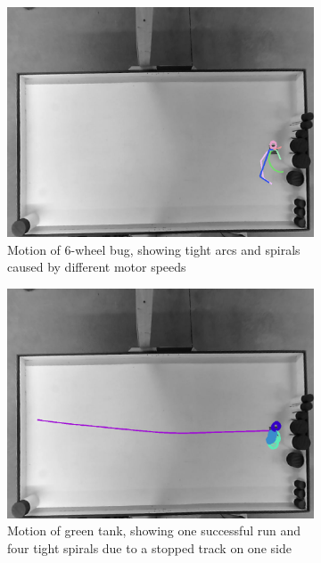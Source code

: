 \begin{figure}[h]
	\begin{subfigure}[t]{0.47\textwidth}
		\includegraphics[width=\textwidth]{../hardwareX_paper/robot_6.png}
		\caption{Motion of 6-wheel bug, showing tight arcs and spirals caused by different motor speeds\label{fig:bug_motion}}
	\end{subfigure}
	\begin{subfigure}[t]{0.47\textwidth}
		\includegraphics[width=\textwidth]{../hardwareX_paper/robot_0.png}
		\caption{Motion of green tank, showing one successful run and four tight spirals due to a stopped track on one side\label{fig:green_tank_motion}}
	\end{subfigure}
	\caption{} %
\end{figure}


